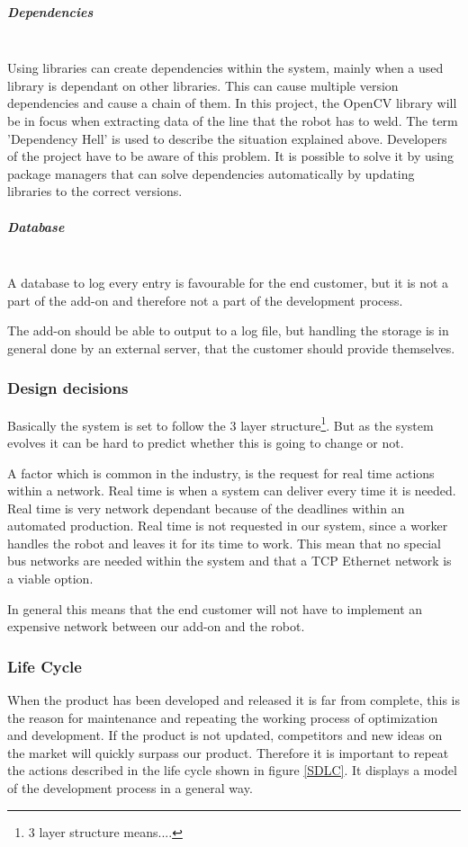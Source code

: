\subparagraph*{Dependencies}~\\
Using libraries can create dependencies within the system, mainly when a used library is dependant on other libraries. This can cause multiple version dependencies and cause a chain of them. In this project, the OpenCV library will be in focus when extracting data of the line that the robot has to weld. 
The term 'Dependency Hell' is used to describe the situation explained above. 
Developers of the project have to be aware of this problem. It is possible to solve it by using package managers that can solve dependencies automatically by updating libraries to the correct versions. 

\subparagraph*{Database}~\\
A database to log every entry is favourable for the end customer, but it is not a part of the add-on and therefore not a part of the development process.

The add-on should be able to output to a log file, but handling the storage is in general done by an external server, that the customer should provide themselves.

\subsubsection{Design decisions}
Basically the system is set to follow the 3 layer structure\footnote{3 layer structure means....}.
But as the system evolves it can be hard to predict whether this is going to change or not. 

A factor which is common in the industry, is the request for real time actions within a network. Real time is when a system can deliver every time it is needed. Real time is very network dependant because of the deadlines within an automated production. 
Real time is not requested in our system, since a worker handles the robot and leaves it for its time to work. This mean that no special bus networks are needed within the system and that a TCP Ethernet network is a viable option. 

In general this means that the end customer will not have to implement an expensive network between our add-on and the robot. 

\clearpage
\subsubsection{Life Cycle}

When the product has been developed and released it is far from complete, this is the reason for maintenance and repeating the working process of optimization and development. If the product is not updated, competitors and new ideas on the market will quickly surpass our product. Therefore it is important to repeat the actions described in the life cycle shown in figure \ref{SDLC}. 
It displays a model of the development process in a general way.


